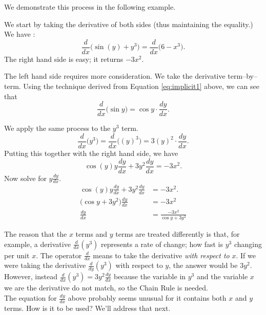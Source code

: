 We demonstrate this process in the following example.\\

{We start by taking the derivative of both sides (thus maintaining the equality.) We have :
$$ \frac{d}{dx}\Big(\sin(y) + y^3\Big)=\frac{d}{dx}\Big(6-x^3\Big).$$
The right hand side is easy; it returns $-3x^2$. 

The left hand side requires more consideration. We take the derivative term--by--term.  Using the technique derived from Equation \ref{eq:implicit1} above, we can see that $$\frac{d}{dx}\Big(\sin y\Big) = \cos y \cdot \frac{dy}{dx}.$$ %

We apply the same process to the $y^3$ term. 
$$\frac{d}{dx}\Big(y^3\Big) = \frac{d}{dx}\Big((y)^3\Big) = 3(y)^2\cdot \frac{dy}{dx}.$$
Putting this together with the right hand side, we have
$$\cos(y)y\frac{dy}{dx}+3y^2\frac{dy}{dx} = -3x^2.$$
Now solve for $y\frac{dy}{dx}$.
		\begin{align*}
		\cos(y)y\frac{dy}{dx}+3y^2\frac{dy}{dx} 	&= -3x^2.\\
		\big(\cos y+3y^2\big)\frac{dy}{dx}&=	-3x^2\\
		\frac{dy}{dx}&=	\frac{-3x^2}{\cos y+3y^2}
		\end{align*}

The reason that the $x$ terms and $y$ terms are treated differently is that, for example, a derivative $\frac{d}{dx}\left(y^3\right)$ represents a rate of change; how fast is $y^3$ changing per unit $x$.  The operator $\frac{d}{dx}$ means to take the derivative \textit{with respect to} $x$.  If we were taking the derivative $\frac{d}{dy}\left(y^3\right)$ with respect to $y$, the answer would be $3y^2$.  However, instead $\frac{d}{dx}\left(y^3\right)=3y^2\frac{dy}{dx}$ because the variable in $y^3$ and the variable $x$ we are the derivative do not match, so the Chain Rule is needed.\\

The equation for $\frac{dy}{dx}$ above probably seems unusual for it contains both $x$ and $y$ terms. How is it to be used? We'll address that next.}\\

